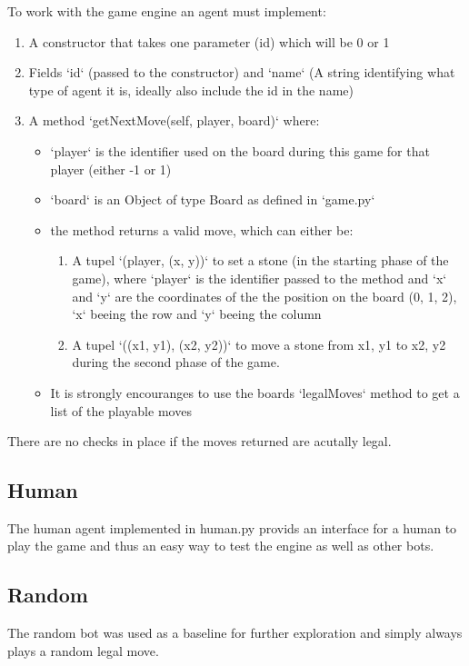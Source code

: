 To work with the game engine an agent must implement:
\begin{enumerate}

    \item A constructor that takes one parameter (id) which will be 0 or 1
    \item Fields `id` (passed to the constructor) and `name` (A string identifying what type of agent it is, ideally also include the id in the name)
    \item A method `getNextMove(self, player, board)` where:
          \begin{itemize}
              \item `player` is the identifier used on the board during this game for that player (either -1 or 1)
              \item `board` is an Object of type Board as defined in `game.py`
              \item the method returns a valid move, which can either be:
                    \begin{enumerate}
                        \item  A tupel `(player, (x, y))` to set a stone (in the starting phase of the game), where `player` is the identifier passed to the method and `x` and `y` are the coordinates of the the position on the board (0, 1, 2), `x` beeing the row and `y` beeing the column
                        \item  A tupel `((x1, y1), (x2, y2))` to move a stone from x1, y1 to x2, y2 during the second phase of the game.
                    \end{enumerate}
              \item It is strongly encouranges to use the boards `legalMoves` method to get a list of the playable moves

          \end{itemize}
\end{enumerate}
There are no checks in place if the moves returned are acutally legal.


\subsection{Human}
The human agent implemented in human.py provids an interface for a human to play
the game and thus an easy way to test the engine as well as other bots.

\subsection{Random}
The random bot was used as a baseline for further exploration and simply always
plays a random legal move.

